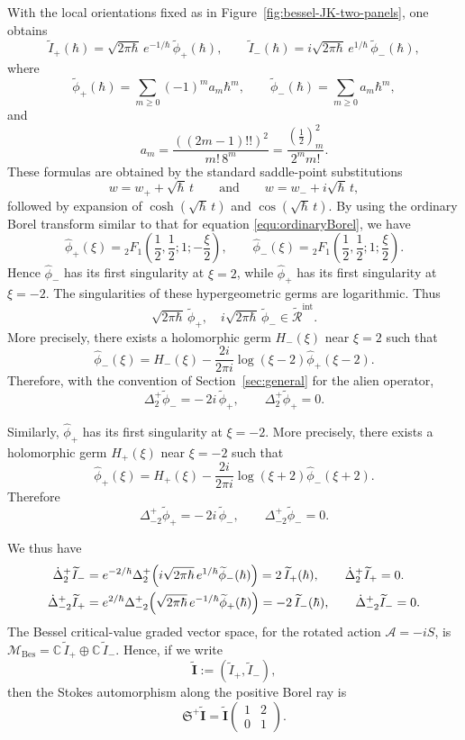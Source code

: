 \documentclass[11pt]{amsart}
\theoremstyle{plain}
\newcommand{\C}{\mathbb C}
\begin{document}
With the local orientations fixed as in Figure~\ref{fig:bessel-JK-two-panels}, one obtains
\[
\widetilde I_+(\hbar)=\sqrt{2\pi\hbar}\,e^{-1/\hbar}\,\widetilde\phi_+(\hbar),
\qquad
\widetilde I_-(\hbar)=i\sqrt{2\pi\hbar}\,e^{1/\hbar}\,\widetilde\phi_-(\hbar),
\]
where
\[
\widetilde\phi_+(\hbar)=\sum_{m\ge0}(-1)^m a_m\hbar^m,
\qquad
\widetilde\phi_-(\hbar)=\sum_{m\ge0}a_m\hbar^m,
\]
and
\[
a_m=\frac{((2m-1)!!)^2}{m!\,8^m}
=\frac{\left(\frac12\right)_m^2}{2^m m!}.
\]
These formulas are obtained by the standard saddle-point substitutions
\[
w=w_++\sqrt{\hbar}\,t
\qquad\text{and}\qquad
w=w_-+i\sqrt{\hbar}\,t,
\]
followed by expansion of \(\cosh(\sqrt{\hbar}\,t)\) and \(\cos(\sqrt{\hbar}\,t)\). By using the ordinary Borel transform similar to that for equation \eqref{equ:ordinaryBorel}, we have
\[
\widehat\phi_+(\xi)
=
{}_2F_1\!\left(\frac12,\frac12;1;-\frac{\xi}{2}\right),
\qquad
\widehat\phi_-(\xi)
=
{}_2F_1\!\left(\frac12,\frac12;1;\frac{\xi}{2}\right).
\]
Hence \(\widehat\phi_-\) has its first singularity at \(\xi=2\), while \(\widehat\phi_+\) has its first singularity at \(\xi=-2\). The singularities of these hypergeometric germs are logarithmic. Thus
\[
\sqrt{2\pi\hbar}\,\widetilde\phi_+,\quad
i\sqrt{2\pi\hbar}\,\widetilde\phi_-
\in \widetilde{\mathcal R}^{\mathrm{int}}.
\]
More precisely, there exists a holomorphic germ \(H_-(\xi)\) near \(\xi=2\) such that
\[
\widehat\phi_-(\xi)
=
H_-(\xi)
-\frac{2i}{2\pi i}\log\!\left(\xi-2\right)\widehat\phi_+(\xi-2).
\]
Therefore, with the convention of Section~\ref{sec:general} for the alien operator,
\[
\Delta_{2}^{+}\widetilde\phi_-=-\,2i\,\widetilde\phi_+,
\qquad
\Delta_{2}^{+}\widetilde\phi_+=0.
\]

Similarly, \(\widehat\phi_+\) has its first singularity at \(\xi=-2\). More precisely, there exists a holomorphic germ \(H_+(\xi)\) near \(\xi=-2\) such that
\[
\widehat\phi_+(\xi)
=
H_+(\xi)
-\frac{2i}{2\pi i}\log\!\left(\xi+2\right)\widehat\phi_-(\xi+2).
\]
Therefore
\[
\Delta_{-2}^{+}\widetilde\phi_+ = -\,2i\,\widetilde\phi_-,
\qquad
\Delta_{-2}^{+}\widetilde\phi_- = 0.
\]


We thus have
\[
\begin{split}
    \dot\Delta_{2}^{+}\widetilde I_-
&=
e^{-2/\hbar}\Delta_{2}^{+}
\Bigl(i\sqrt{2\pi\hbar}\,e^{1/\hbar}\widetilde\phi_-(\hbar)\Bigr)
=
2\,\widetilde I_+(\hbar),
\qquad
\dot\Delta_{2}^{+}\widetilde I_+=0.
\\
\dot\Delta_{-2}^{+}\widetilde I_+
&=
e^{2/\hbar}\Delta_{-2}^{+}
\Bigl(\sqrt{2\pi\hbar}\,e^{-1/\hbar}\widetilde\phi_+(\hbar)\Bigr)
=
-2\,\widetilde I_-(\hbar), \qquad
\dot\Delta_{-2}^{+}\widetilde I_-=0.
\end{split}
\]
%
The Bessel critical-value graded vector space, for the rotated action
\(\mathcal A=-iS\), is $
\mathcal M_{\mathrm{Bes}}
=
\C\,\widetilde I_+\oplus \C\,\widetilde I_-$.
Hence, if we write
\[
\widetilde{\mathbf I}:=(\widetilde I_+,\widetilde I_-),
\]
then the Stokes automorphism along the positive Borel ray is
\[
\mathfrak S^{+}\widetilde{\mathbf I}
=
\widetilde{\mathbf I}
\begin{pmatrix}
1&2\\
0&1
\end{pmatrix}.
\]
\end{document}
